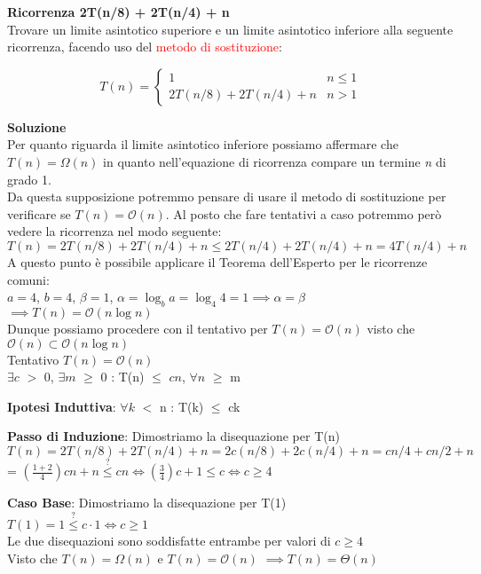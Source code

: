 \documentclass[../cheatSheetAlgoritmi.tex]{subfiles}
\begin{document}
\bigskip
\textbf{Ricorrenza 2T(n/8) + 2T(n/4) + n}\\
Trovare un limite asintotico superiore e un limite asintotico inferiore alla seguente ricorrenza, facendo uso del \textcolor{red}{metodo di sostituzione}:
\begin{center}
	\begin{equation*}
		T(n)=\begin{cases}
			1 & \text{$n \leq 1$}\\
			2T(n/8) + 2T(n/4) + n & \text{$n > 1$}
 	 	\end{cases}
	\end{equation*}
\end{center}
\textbf{Soluzione}\\
Per quanto riguarda il limite asintotico inferiore possiamo affermare che $T(n) = \Omega(n)$ in quanto nell'equazione di ricorrenza compare un termine \textit{n} di grado 1.\\
Da questa supposizione potremmo pensare di usare il metodo di sostituzione per verificare se $T(n) = \mathcal{O}(n)$. Al posto che fare tentativi a caso potremmo però vedere la ricorrenza nel modo seguente:\\
$T(n) = 2T(n/8) + 2T(n/4) + n \leq 2T(n/4) + 2T(n/4) + n = 4T(n/4) + n$\\
A questo punto è possibile applicare il Teorema dell'Esperto per le ricorrenze comuni:\\
$a = 4$, $b = 4$, $\beta = 1$, $\alpha = \log_{b}{a} = \log_{4}{4} = 1 \implies \alpha = \beta$\\
$\implies T(n) = \mathcal{O}(n\log{n})$\\
Dunque possiamo procedere con il tentativo per $T(n) = \mathcal{O}(n)$ visto che $\mathcal{O}(n) \subset \mathcal{O}(n\log{n})$\\
Tentativo $T(n) = \mathcal{O}(n)$\\
$\exists c$ $>$ 0, $\exists m$ $\geq$ 0 : T(n) $\leq$ $cn$, $\forall n$ $\geq$ m

\bigskip
\textbf{Ipotesi Induttiva}: $\forall k$ $<$ n : T(k) $\leq$ ck

\textbf{Passo di Induzione}: Dimostriamo la disequazione per T(n)\\
$T(n) = 2T(n/8) + 2T(n/4) + n = 2c(n/8) + 2c(n/4) + n = cn/4 + cn/2 + n$\\
= $(\frac{1 + 2}{4})cn + n \stackrel{?}{\leq} cn \iff (\frac{3}{4})c + 1 \leq c \iff c \geq 4$

\bigskip
\textbf{Caso Base}: Dimostriamo la disequazione per T(1)\\
$T(1) = 1 \stackrel{?}{\leq} c \cdot 1 \iff c \geq 1$\\
Le due disequazioni sono soddisfatte entrambe per valori di $c \geq 4$\\
Visto che $T(n) = \Omega(n)$ e $T(n) = \mathcal{O}(n)$ $\implies T(n) = \Theta(n)$
\end{document}
